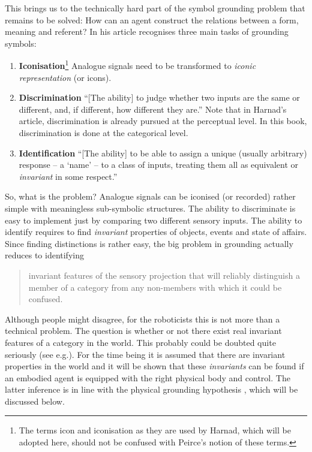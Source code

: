 

This brings us to the technically hard part of the symbol grounding problem that remains to be solved: How can an agent construct the relations between a form, meaning and referent? In his article \citet{harnad:1990} recognises three main tasks of grounding symbols:

\begin{enumerate}
\item {\bf Iconisation}\footnote{The terms icon and iconisation as they are used by Harnad, which will be adopted here, should not be confused with Peirce's notion of these terms.} Analogue signals need to be transformed to {\em iconic representation} (or icons).
\item {\bf Discrimination} ``[The ability] to judge whether two inputs are the same or different, and, if different, how different they are.'' Note that in Harnad's article, discrimination is already pursued at the perceptual level. In this book, discrimination is done at the categorical level.
\item {\bf Identification} ``[The ability] to be able to assign a unique (usually arbitrary) response -- a `name' -- to a class of inputs, treating them all as equivalent or {\em invariant} in some respect.'' \cite[my italics]{harnad:1990}
\end{enumerate}


So, what is the problem? Analogue signals can be iconised (or recorded) rather simple with meaningless sub-symbolic structures. The ability to discriminate is easy to implement just by comparing two different sensory inputs. The ability to identify requires to find {\em invariant} properties of objects, events and state of affairs. Since finding distinctions is rather easy, the big problem in grounding actually reduces to identifying

\begin{quote}
invariant features of the sensory projection that will reliably distinguish a member of  a category from any non-members with which it could be confused. \citep{harnad:1990}
\end{quote}

Although people might disagree, for the roboticists this is not more than a technical problem. The question is whether or not there exist real invariant features of a category in the world. This probably could be doubted quite seriously (see e.g.\citealt{harnad:1993}). For the time being it is assumed that there are invariant properties in the world and it will be shown that these {\em invariants} can be found if an embodied agent is equipped with the right physical body and control. The latter inference is in line with the {\sc physical grounding hypothesis} \citep{brooks:1990}, which will be discussed below.


